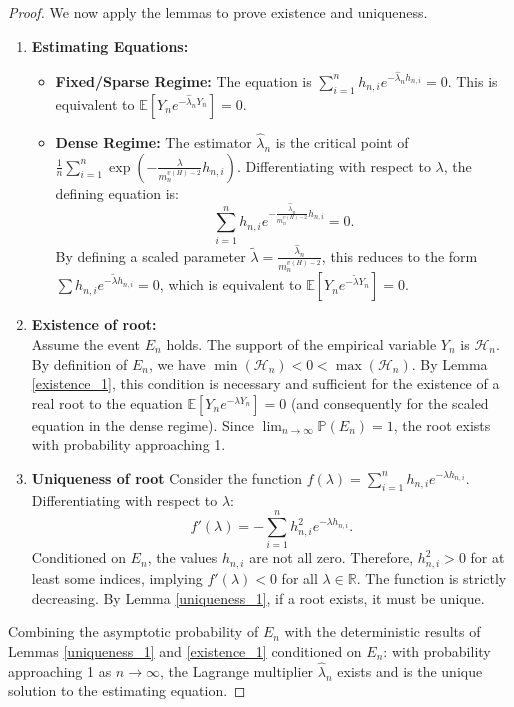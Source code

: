 \documentclass[12pt]{article}
\numberwithin{equation}{section}
\begin{document}
\begin{proof}

We now apply the lemmas to prove existence and uniqueness.\\

\begin{enumerate}
\item \textbf{Estimating Equations:}\\


\begin{itemize}
    \item \textbf{Fixed/Sparse Regime:} The equation is $\sum_{i=1}^n h_{n,i} e^{-\hat{\lambda}_n h_{n,i}} = 0$. This is equivalent to $\mathbb{E}[Y_n e^{-\hat{\lambda}_n Y_n}] = 0$.
    \item \textbf{Dense Regime:} The estimator $\hat{\lambda}_n$ is the critical point of $\frac{1}{n} \sum_{i=1}^n \exp\left(-\frac{\lambda}{m_n^{v(H)-2}} h_{n,i}\right)$. Differentiating with respect to $\lambda$, the defining equation is:
    \[
    \sum_{i=1}^n h_{n,i} e^{-\frac{\hat{\lambda}_n}{m_n^{v(H)-2}} h_{n,i}} = 0.
    \]
    By defining a scaled parameter $\tilde{\lambda} = \frac{\hat{\lambda}_n}{m_n^{v(H)-2}}$, this reduces to the form $\sum h_{n,i} e^{-\tilde{\lambda} h_{n,i}} = 0$, which is equivalent to $\mathbb{E}[Y_n e^{-\tilde{\lambda} Y_n}] = 0$.\\
\end{itemize}
\item \textbf{Existence of root:}\\


Assume the event $E_n$ holds. The support of the empirical variable $Y_n$ is $\mathcal{H}_n$. By definition of $E_n$, we have $\min(\mathcal{H}_n) < 0 < \max(\mathcal{H}_n)$. By Lemma \ref{existence_1}, this condition is necessary and sufficient for the existence of a real root to the equation $\mathbb{E}[Y_n e^{-\lambda Y_n}] = 0$ (and consequently for the scaled equation in the dense regime). Since $\lim_{n \to \infty} \mathbb{P}(E_n) = 1$, the root exists with probability approaching 1.

\item \textbf{Uniqueness of root}
Consider the function $f(\lambda) = \sum_{i=1}^n h_{n,i} e^{-\lambda h_{n,i}}$. Differentiating with respect to $\lambda$:
\[
f'(\lambda) = -\sum_{i=1}^n h_{n,i}^2 e^{-\lambda h_{n,i}}.
\]
Conditioned on $E_n$, the values $h_{n,i}$ are not all zero. Therefore, $h_{n,i}^2 > 0$ for at least some indices, implying $f'(\lambda) < 0$ for all $\lambda \in \mathbb{R}$. The function is strictly decreasing. By Lemma \ref{uniqueness_1}, if a root exists, it must be unique.

\end{enumerate}

Combining the asymptotic probability of $E_n$ with the deterministic results of Lemmas \ref{uniqueness_1} and \ref{existence_1} conditioned on $E_n$: with probability approaching 1 as $n \to \infty$, the Lagrange multiplier $\hat{\lambda}_n$ exists and is the unique solution to the estimating equation.
\end{proof}

% 
\end{document}
